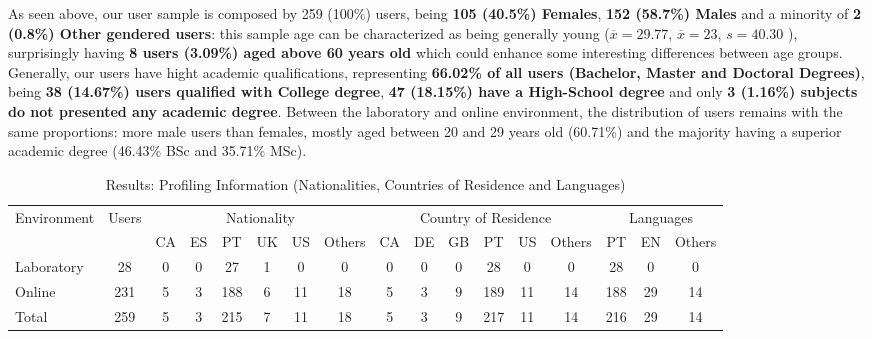%
As seen above, our user sample is composed by 259 (100\%) users, being \textbf{105 (40.5\%) Females}, \textbf{152 (58.7\%) Males} and a minority of \textbf{2 (0.8\%) Other gendered users}: this sample age can
be characterized as being generally young ($\overline{x} = 29.77$, $\overline{x} = 23$, $s = 40.30$ ), surprisingly having \textbf{8 users (3.09\%) aged above 60 years old} which could enhance some interesting
differences between age groups. Generally, our users have hight academic qualifications, representing \textbf{66.02\% of all users (Bachelor, Master and Doctoral Degrees)}, being \textbf{38 (14.67\%) users
qualified with College degree}, \textbf{47 (18.15\%) have a High-School degree} and only \textbf{3 (1.16\%) subjects do not presented any academic degree}. Between the laboratory and online environment, the distribution
of users remains with the same proportions: more male users than females, mostly aged between 20 and 29 years old (60.71\%) and the majority having a superior academic degree (46.43\% BSc and 35.71\% MSc). \par
%
\begin{table}[htbp]
  \resizebox{\textwidth}{!} {
  \begin{tabular}{| l || c || c | c | c | c | c | c || c | c | c | c | c | c || c | c | c |}
    \hline
    \multicolumn{1}{|c||}{\multirow{2}{*}{Environment}} & \multirow{2}{*}{Users} & \multicolumn{6}{c||}{Nationality} & \multicolumn{6}{c||}{Country of Residence} & \multicolumn{3}{c|}{Languages} \\ \cline{3-17}
    \multicolumn{1}{|c||}{}                             &                        & CA  & ES & PT & UK & US & Others & CA   & DE   & GB   & PT   & US  & Others  & PT      & EN      & Others     \\ \hline
    Laboratory                                         & 28                     & 0   & 0  & 27 & 1  & 0  & 0      & 0    & 0    & 0    & 28   & 0   & 0       & 28      & 0       & 0          \\ \hline
    Online                                             & 231                    & 5   & 3  & 188& 6  & 11 & 18     & 5    & 3    & 9    & 189  & 11  & 14      & 188     & 29      & 14         \\ \hline \hline
    Total                                              & 259                    & 5   & 3  & 215& 7  & 11 & 18     & 5    & 3    & 9    & 217  & 11  & 14      & 216     & 29      & 14         \\ \hline
  \end{tabular}}
  \caption[Results: Profiling Information (Nationalities, Countries of Residence and Languages)]{Results: Profiling Information (Nationalities, Countries of Residence and Languages)}
  \vspace{-5pt}
  \label{table:profiling_nacionalities}
\end{table}
